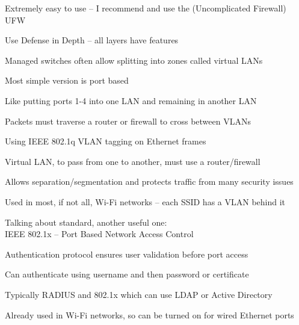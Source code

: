 \documentclass[Screen16to9,17pt]{foils}
\begin{document}
\begin{list2}
\item Extremely easy to use -- I recommend and use the (Uncomplicated Firewall) UFW
\end{list2}



\centerline{Use Defense in Depth -- all layers have features}






\begin{list1}
\item Managed switches often allow splitting into zones called virtual LANs
\item Most simple version is port based
\item Like putting ports 1-4 into one LAN and remaining in another LAN
\item Packets must traverse a router or firewall to cross between VLANs
\end{list1}



\begin{list1}
\item Using IEEE 802.1q  VLAN tagging on Ethernet frames
\item Virtual LAN, to pass from one to another, must use a router/firewall
\item Allows separation/segmentation and protects traffic from many security issues
\item Used in most, if not all, Wi-Fi networks -- each SSID has a VLAN behind it
\end{list1}





Talking about standard, another useful one:\\
IEEE 802.1x -- Port Based Network Access Control


\begin{list1}
\item Authentication protocol ensures user validation before port access
\item Can authenticate using username and then password or certificate
\item Typically RADIUS and 802.1x which can use LDAP or Active Directory
\item Already used in Wi-Fi networks, so can be turned on for wired Ethernet ports
\end{list1}
\end{document}
